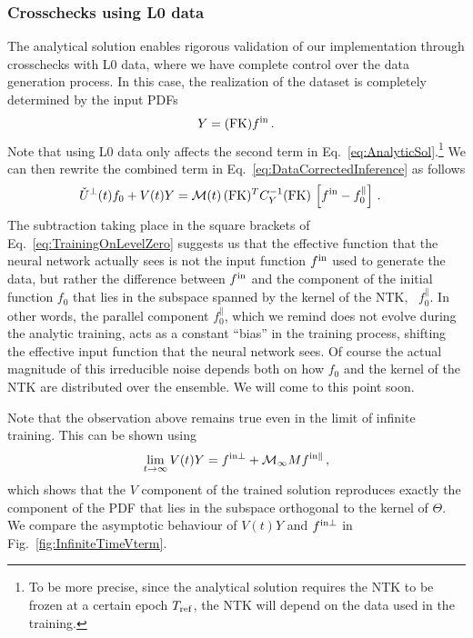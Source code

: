 \subsubsection{Crosschecks using L0 data}
\label{sec:AnalyticalChecks}

The analytical solution enables rigorous validation of our implementation 
through crosschecks with L0 data, where we have complete control over 
the data generation process. In this case, the realization of the dataset is 
completely determined by the input PDFs
\begin{equation}
    \label{eq:DataL0NoIndices}
    Y = (\mathrm{FK}) f^{\rm in}\, .
\end{equation}
Note that using L0 data only affects the second term in
Eq.~\ref{eq:AnalyticSol}.\footnote{To be more precise, since the analytical
solution requires the NTK to be frozen at a certain epoch $T_{\rm ref}$, the
NTK will depend on the data used in the training.} We can then rewrite
the combined term in Eq.~\eqref{eq:DataCorrectedInference} as follows
\begin{align}
  \label{eq:TrainingOnLevelZero}
  \check{U}^\perp(t) f_0 + V(t) Y 
    &= \mathcal{M}(t)\, (\mathrm{FK})^T C_{Y}^{-1} (\mathrm{FK})\, 
      \left[f^{\rm in} - f_{0}^\parallel\right]\, .
\end{align}
The subtraction taking place in the square brackets of
Eq.~\eqref{eq:TrainingOnLevelZero} suggests us that the effective function that
the neural network actually sees is not the input function $f^{\rm in}$ used to
generate the data, but rather the difference between $f^{\rm in}$ and the component of
the initial function $f_0$ that lies in the subspace spanned by the kernel of
the NTK, \ie\ $f_0^\parallel$. In other words, the parallel component
$f_0^\parallel$, which we remind does not evolve during the analytic training,
acts as a constant ``bias'' in the training process, shifting the effective
input function that the neural network sees. Of course the actual magnitude of
this irreducible noise depends both on how $f_0$ and the kernel of the NTK are
distributed over the ensemble. We will come to this point soon.

Note that the observation above remains true even in the limit of infinite
training. This can be shown using 
\begin{align}
    \label{eq:LevelZeroClosureInfiniteTraining}
    \lim_{t\to\infty} V(t) Y = f^{\rm in \perp} + \mathcal{M}_{\infty} M f^{\rm in \parallel}\, ,
\end{align}
which shows that the $V$ component of the trained solution reproduces exactly the
component of the PDF that lies in  the subspace orthogonal to the kernel of
$\Theta$. We compare the asymptotic behaviour of $V(t) Y$ and $f^{\rm in \perp}$ in
Fig.~\ref{fig:InfiniteTimeVterm}.

